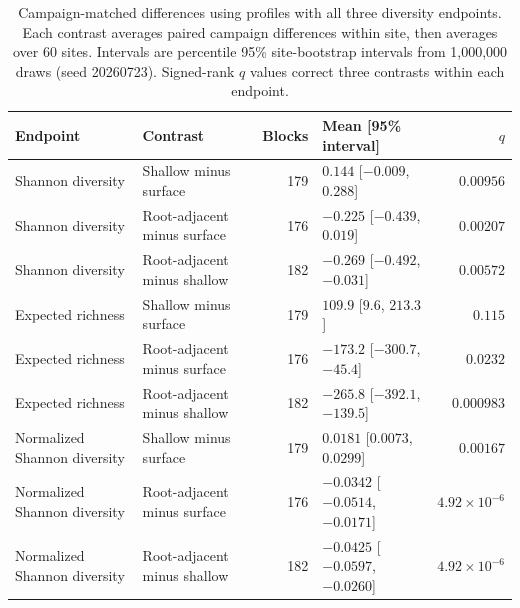 \begin{table}[htbp]\centering\footnotesize
\caption{Campaign-matched differences using profiles with all three diversity endpoints. Each contrast averages paired campaign differences within site, then averages over 60 sites. Intervals are percentile 95\% site-bootstrap intervals from 1,000,000 draws (seed 20260723). Signed-rank $q$ values correct three contrasts within each endpoint.}
\label{tab:matched-alpha}
\begin{tabular}{P{2.5cm}P{3.9cm}rP{3.7cm}r}\toprule
Endpoint & Contrast & Blocks & Mean [95\% interval] & $q$ \\\midrule
Shannon diversity & Shallow minus surface & 179 & $0.144$ [$-0.009$, $0.288$] & $0.00956$ \\
Shannon diversity & Root-adjacent minus surface & 176 & $-0.225$ [$-0.439$, $0.019$] & $0.00207$ \\
Shannon diversity & Root-adjacent minus shallow & 182 & $-0.269$ [$-0.492$, $-0.031$] & $0.00572$ \\
Expected richness & Shallow minus surface & 179 & $109.9$ [$9.6$, $213.3$] & $0.115$ \\
Expected richness & Root-adjacent minus surface & 176 & $-173.2$ [$-300.7$, $-45.4$] & $0.0232$ \\
Expected richness & Root-adjacent minus shallow & 182 & $-265.8$ [$-392.1$, $-139.5$] & $0.000983$ \\
Normalized Shannon diversity & Shallow minus surface & 179 & $0.0181$ [$0.0073$, $0.0299$] & $0.00167$ \\
Normalized Shannon diversity & Root-adjacent minus surface & 176 & $-0.0342$ [$-0.0514$, $-0.0171$] & $4.92\times10^{-6}$ \\
Normalized Shannon diversity & Root-adjacent minus shallow & 182 & $-0.0425$ [$-0.0597$, $-0.0260$] & $4.92\times10^{-6}$ \\
\bottomrule\end{tabular}\end{table}

